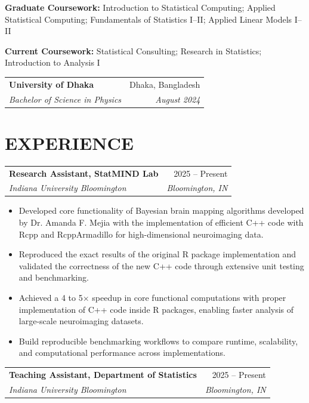 \documentclass[10pt,letterpaper]{article}
\makeatletter
\newcommand{\resumeEntry}[4]{%
  \begin{tabularx}{\textwidth}{@{}Xr@{}}
    \textbf{#1} & #2 \\
    \textit{#3} & \textit{#4}
  \end{tabularx}%
}
\newenvironment{resumeItems}{%
  \begin{itemize}[
    label=\textbullet,
    leftmargin=14pt,
    labelsep=5pt,
    itemsep=0.5pt,
    topsep=1.0pt,
    parsep=0pt,
    partopsep=0pt
  ]
}{%
  \end{itemize}
}
\makeatother
\begin{document}
\textbf{Graduate Coursework:}
Introduction to Statistical Computing; Applied Statistical Computing;
Fundamentals of Statistics I--II; Applied Linear Models I--II

\vspace{0.3pt}

\textbf{Current Coursework:}
Statistical Consulting; Research in Statistics;
Introduction to Analysis I

\vspace{2.2pt}

\resumeEntry
  {University of Dhaka}
  {Dhaka, Bangladesh}
  {Bachelor of Science in Physics}
  {August 2024}

\section*{EXPERIENCE}

\resumeEntry
  {Research Assistant, StatMIND Lab}
  {2025 -- Present}
  {Indiana University Bloomington}
  {Bloomington, IN}

\begin{resumeItems}
  \item Developed core functionality of Bayesian brain mapping algorithms developed by Dr. Amanda F. Mejia with the implementation of efficient C++ code with Rcpp and RcppArmadillo for high-dimensional neuroimaging data.
  
  \item Reproduced the exact results of the original R package implementation and validated the correctness of the new C++ code through extensive unit testing and benchmarking.
  
  \item Achieved a 4 to 5$\times$ speedup in core functional computations with proper implementation of C++ code inside R packages, enabling faster analysis of large-scale neuroimaging datasets.

  \item Build reproducible benchmarking workflows to compare runtime, scalability, and computational performance across implementations.
  
\end{resumeItems}

\vspace{1.3pt}

\resumeEntry
  {Teaching Assistant, Department of Statistics}
  {2025 -- Present}
  {Indiana University Bloomington}
  {Bloomington, IN}
\end{document}
